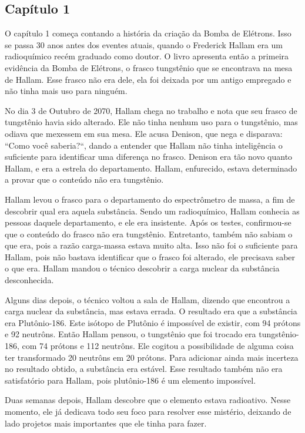 \documentclass[14pt,portuguese]{extreport}
\begin{document}
	\subsection{Capítulo 1}

	  O capítulo 1 começa contando a história da criação da Bomba de Elétrons. Isso se passa 30 anos antes dos eventes atuais, quando o Frederick Hallam era um radioquímico recém graduado como doutor. 
	  O livro apresenta então a primeira evidência da Bomba de Elétrons, o frasco tungstênio que se encontrava na mesa de Hallam. Esse frasco não era dele, ela foi deixada por um antigo empregado e 
	  não tinha mais uso para ninguém. 
	  
	  No dia 3 de Outubro de 2070, Hallam chega no trabalho e nota que seu frasco de tungstênio havia sido alterado. Ele não tinha nenhum uso para o tungstênio, mas odiava que mexessem em sua mesa.
	  Ele acusa Denison, que nega e disparava: ``Como você saberia?``, dando a entender que Hallam não tinha inteligência o suficiente para identificar uma diferença no frasco. Denison era 
	  tão novo quanto Hallam, e era a estrela do departamento. Hallam, enfurecido, estava determinado a provar que o conteúdo não era tungstênio.
	  
	  Hallam levou o frasco para o departamento do espectrômetro de massa, a fim de descobrir qual era aquela substância. Sendo um radioquímico, Hallam conhecia as pessoas daquele departamento, e ele era 
	  insistente. Após os testes, confirmou-se que o conteúdo do frasco não era tungstênio. Entretanto, também não sabiam o que era, pois a razão carga-massa estava muito alta. 
	  Isso não foi o suficiente para Hallam, pois não bastava identificar que o frasco foi alterado, ele precisava saber o que era. Hallam mandou o técnico descobrir a carga nuclear da substância desconhecida.
	  
	  Alguns dias depois, o técnico voltou a sala de Hallam, dizendo que encontrou a carga nuclear da substância, mas estava errada. O resultado era que a substância era Plutônio-186. 
	  Este isótopo de Plutônio é impossível de existir, com 94 prótons e 92 neutrôns. Então Hallam pensou, o tungstênio que foi trocado era tungstênio-186, com 74 prótons e 112 neutrôns. 
	  Ele cogitou a possibilidade de alguma coisa ter transformado 20 neutrôns em 20 prótons. Para adicionar ainda mais incerteza no resultado obtido, a substância era estável. 
	  Esse resultado também não era satisfatório para Hallam, pois plutônio-186 é um elemento impossível.
	  
	  Duas semanas depois, Hallam descobre que o elemento estava radioativo. Nesse momento, ele já dedicava todo seu foco para resolver esse mistério, deixando de lado projetos mais importantes que ele 
	  tinha para fazer. 
	  
\end{document}
